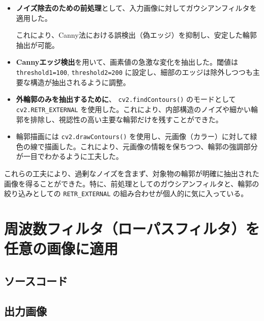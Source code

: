 \documentclass[a4paper,11pt,titlepage]{jsarticle}
\begin{document}
\begin{itemize}
  \item \textbf{ノイズ除去のための前処理}として、入力画像に対してガウシアンフィルタを適用した。
  
  これにより、Canny法における誤検出（偽エッジ）を抑制し、安定した輪郭抽出が可能。
  
  \item \textbf{Cannyエッジ検出}を用いて、画素値の急激な変化を抽出した。閾値は \texttt{threshold1=100}, \texttt{threshold2=200} に設定し、細部のエッジは除外しつつも主要な構造が抽出されるように調整。
  
  \item \textbf{外輪郭のみを抽出するために}、 \texttt{cv2.findContours()} のモードとして \texttt{cv2.RETR\_EXTERNAL} を使用した。これにより、内部構造のノイズや細かい輪郭を排除し、視認性の高い主要な輪郭だけを残すことができた。
  
  \item 輪郭描画には \texttt{cv2.drawContours()} を使用し、元画像（カラー）に対して緑色の線で描画した。これにより、元画像の情報を保ちつつ、輪郭の強調部分が一目でわかるように工夫した。
\end{itemize}

これらの工夫により、過剰なノイズを含まず、対象物の輪郭が明確に抽出された画像を得ることができた。特に、前処理としてのガウシアンフィルタと、輪郭の絞り込みとしての \texttt{RETR\_EXTERNAL} の組み合わせが個人的に気に入っている。

\section{周波数フィルタ（ローパスフィルタ）を任意の画像に適用}
\subsection{ソースコード}


\subsection{出力画像}
\end{document}

